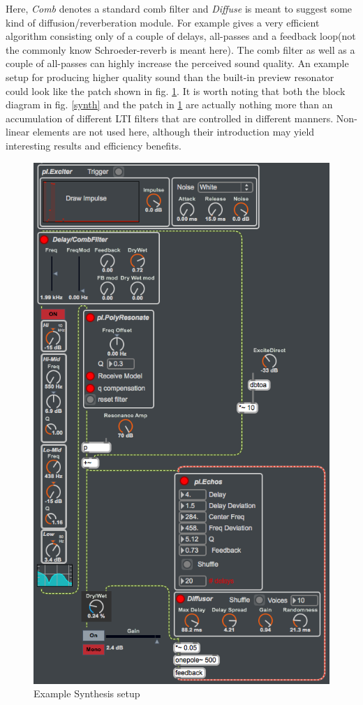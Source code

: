 Here, \textit{Comb} denotes a standard comb filter and \textit{Diffuse} is meant to suggest some kind of diffusion/reverberation module. For example \citep[p. 7]{schroeder_natural_1961} gives a very efficient algorithm consisting only of a couple of delays, all-passes and a feedback loop(not the commonly know Schroeder-reverb is meant here). The comb filter as well as a couple of all-passes can highly increase the perceived sound quality. An example setup for producing higher quality sound than the built-in preview resonator could look like the patch shown in fig. \ref{synthExample}. It is worth noting that both the block diagram in fig. \ref{synth} and the patch in \ref{synthExample} are actually nothing more than an accumulation of different LTI filters that are controlled in different manners. Non-linear elements are not used here, although their introduction may yield interesting results and efficiency benefits.


\begin{figure}[h]
	\begin{center}
		\includegraphics[width = 12cm]{img/synthExample.png}
		\caption{Example Synthesis setup}
		\label{synthExample}
	\end{center}
\end{figure}

